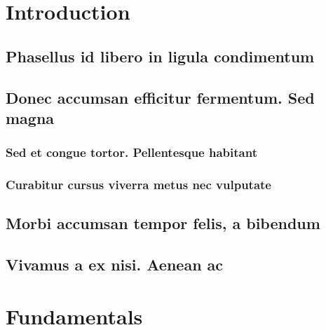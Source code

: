 \documentclass[bachelor, english, debug]{student}
\begin{document}
\tableofcontents

\listoffigures

\listoftables

\listoftodos

\mainmatter


\chapter{Introduction}

\section{Phasellus id libero in ligula condimentum}

\lipsum[1-8]

\section{Donec accumsan efficitur fermentum. Sed magna}

\lipsum[1-8]

\subsection{Sed et congue tortor. Pellentesque habitant}

\lipsum[1-8]

\subsection{Curabitur cursus viverra metus nec vulputate}

\lipsum[1-8]

\section{Morbi accumsan tempor felis, a bibendum}

\lipsum[1-8]

\section{Vivamus a ex nisi. Aenean ac}

\lipsum[1-8]



\chapter{Fundamentals}
\end{document}
